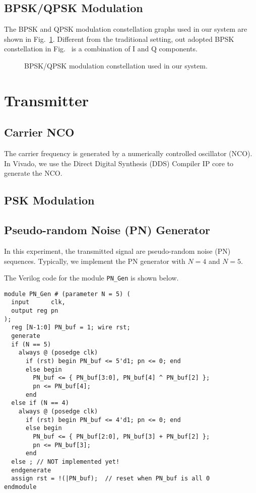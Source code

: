 \documentclass[journal,twoside]{IEEEtran}
\begin{document}
    \subsection{BPSK/QPSK Modulation}

      The BPSK and QPSK modulation constellation graphs used in our system are shown in Fig.~\ref{fig:constellation}.
      Different from the traditional setting, out adopted BPSK constellation in Fig.~
      is a combination of I and Q components.
      \begin{figure}[htbp]
        \hfill%
        \caption{BPSK/QPSK modulation constellation used in our system.}
        \label{fig:constellation}
      \end{figure}

    \IEEEpubidadjcol
    \section{Transmitter}

    \subsection{Carrier NCO}

      The carrier frequency is generated by a numerically controlled oscillator (NCO).
      In Vivado, we use the Direct Digital Synthesis (DDS) Compiler IP core to generate the NCO.

  \subsection{PSK Modulation}

    \subsection{Pseudo-random Noise (PN) Generator}

      In this experiment, the transmitted signal are pseudo-random noise (PN) sequences.
      Typically, we implement the PN generator with $N=4$ and $N=5$. %

      \newpage
      The Verilog code for the module \texttt{PN\_Gen} is shown below.
      \begin{verbatim}
module PN_Gen # (parameter N = 5) (
  input      clk,
  output reg pn
);
  reg [N-1:0] PN_buf = 1; wire rst;
  generate
  if (N == 5)
    always @ (posedge clk)
      if (rst) begin PN_buf <= 5'd1; pn <= 0; end
      else begin
        PN_buf <= { PN_buf[3:0], PN_buf[4] ^ PN_buf[2] };
        pn <= PN_buf[4];
      end
  else if (N == 4)
    always @ (posedge clk)
      if (rst) begin PN_buf <= 4'd1; pn <= 0; end
      else begin
        PN_buf <= { PN_buf[2:0], PN_buf[3] + PN_buf[2] };
        pn <= PN_buf[3];
      end
  else ; // NOT implemented yet!
  endgenerate
  assign rst = !(|PN_buf);  // reset when PN_buf is all 0
endmodule
      \end{verbatim}
\end{document}
